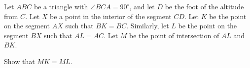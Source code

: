 Let 
$ABC$
 be a triangle with 
$\angle BCA=90^{\circ}$, 
 and let 
$D$
 be the foot of the altitude from 
$C$.
 Let 
$X$
 be a point in the interior of the segment 
$CD$.
 Let 
$K$
 be the point on the segment 
$AX$
 such that 
$BK=BC$.
 Similarly, let 
$L$
 be the point on the segment 
$BX$
 such that 
$AL=AC$.
 Let 
$M$
 be the point of intersection of 
$AL$
 and 
$BK$.


Show that 
$MK=ML$.
